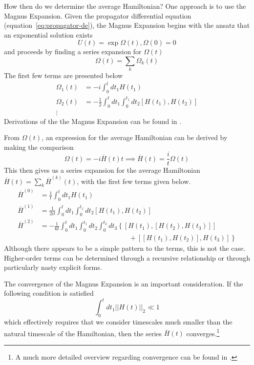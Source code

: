 How then do we determine the average Hamiltonian? One approach is to use the Magnus Expansion.\cite{Blanes_2009,2010EJPh...31..907B} Given the propagator differential equation (equation~\ref{eq:propagator-de}), the Magnus Expansion begins with the ansatz that an exponential solution exists
\[
U(t) = \exp{\Omega(t)}, \Omega(0) = 0
\]
and proceeds by finding a series expansion for $\Omega(t)$
\[
\Omega(t) = \sum_k \Omega_k(t)
\]
The first few terms are presented below
\begin{align*}
    \Omega_1(t) &= -i \int_0^t dt_1 H(t_1) \\
    \Omega_2(t) &= -\frac{1}{2} \int_0^t dt_1 \int_0^{t_1} dt_2 [H(t_1), H(t_2)] \\
    \vdots
\end{align*}
Derivations of the the Magnus Expansion can be found in
\cite{gerstein-dybowski,Blanes_2009,2010EJPh...31..907B}.

From $\Omega(t)$, an expression for the average Hamiltonian can be derived by making the comparison
\[
\Omega(t) = -i \overline{H}(t) t \implies \overline{H}(t) = \frac{i}{t} \Omega(t)
\]
This then gives us a series expansion for the average Hamiltonian $\overline{H}(t) = \sum_k \overline{H}^{(k)}(t)$, with the first few terms given below.
\begin{align}
    \label{eq:AHT-term-0}
    \overline{H}^{(0)} &= \frac{1}{t} \int_0^{t} dt_1 H(t_1) \\
    \label{eq:AHT-term-1}
    \overline{H}^{(1)} &= \frac{1}{2it} \int_0^{t} dt_1 \int_0^{t_1} dt_2
        \left[H(t_1), H(t_2)\right] \\
    \label{eq:AHT-term-2}
    \overline{H}^{(2)} &= -\frac{1}{6t}
    \int_0^{t} dt_1 \int_0^{t_1} dt_2 \int_0^{t_2} dt_3
    \left\{
    \left[H(t_1), \left[H(t_2), H(t_3)\right]\right] \right. \\
    & \hspace{13em} + \left.
    \left[\left[H(t_1), H(t_2)\right], H(t_3)\right]
    \right\}
\end{align}
Although there appears to be a simple pattern to the terms, this is not the case. Higher-order terms can be determined through a recursive relationship or through particularly nasty explicit forms.

The convergence of the Magnus Expansion is an important consideration. If the following condition is satisfied
\begin{equation}\label{eq:AHT-convergence}
    \int_0^t dt_1 ||H(t)||_2 \ll 1
\end{equation}
which effectively requires that we consider timescales much smaller than the natural timescale of the Hamiltonian, then the series $\overline{H}(t)$ converges.\footnote{A much more detailed overview regarding convergence can be found in \cite{Blanes_2009}.}


